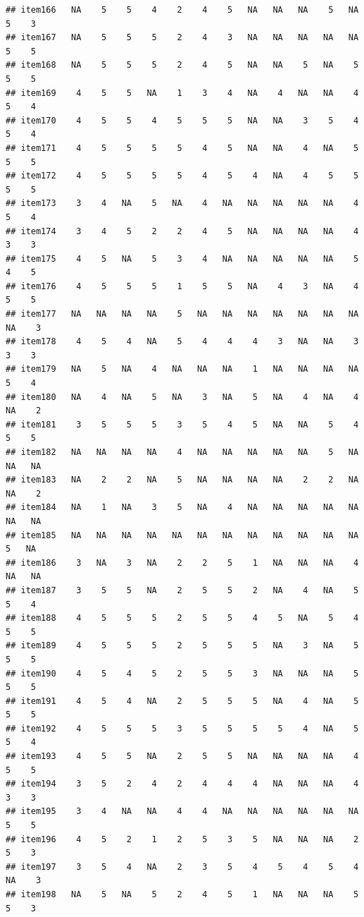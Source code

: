 \documentclass[
  man]{apa6}
\begin{document}
\begin{verbatim}
## item166   NA    5    5    4    2    4    5   NA   NA   NA    5   NA    5    3
## item167   NA    5    5    5    2    4    3   NA   NA   NA   NA   NA    5    5
## item168   NA    5    5    5    2    4    5   NA   NA    5   NA    5    5    5
## item169    4    5    5   NA    1    3    4   NA    4   NA   NA    4    5    4
## item170    4    5    5    4    5    5    5   NA   NA    3    5    4    5    4
## item171    4    5    5    5    5    4    5   NA   NA    4   NA    5    5    5
## item172    4    5    5    5    5    4    5    4   NA    4    5    5    5    5
## item173    3    4   NA    5   NA    4   NA   NA   NA   NA   NA    4    5    4
## item174    3    4    5    2    2    4    5   NA   NA   NA   NA    4    3    3
## item175    4    5   NA    5    3    4   NA   NA   NA   NA   NA    5    4    5
## item176    4    5    5    5    1    5    5   NA    4    3   NA    4    5    5
## item177   NA   NA   NA   NA    5   NA   NA   NA   NA   NA   NA   NA   NA    3
## item178    4    5    4   NA    5    4    4    4    3   NA   NA    3    3    3
## item179   NA    5   NA    4   NA   NA   NA    1   NA   NA   NA   NA    5    4
## item180   NA    4   NA    5   NA    3   NA    5   NA    4   NA    4   NA    2
## item181    3    5    5    5    3    5    4    5   NA   NA    5    4    5    5
## item182   NA   NA   NA   NA    4   NA   NA   NA   NA   NA    5   NA   NA   NA
## item183   NA    2    2   NA    5   NA   NA   NA   NA    2    2   NA   NA    2
## item184   NA    1   NA    3    5   NA    4   NA   NA   NA   NA   NA   NA   NA
## item185   NA   NA   NA   NA   NA   NA   NA   NA   NA   NA   NA   NA    5   NA
## item186    3   NA    3   NA    2    2    5    1   NA   NA   NA    4   NA   NA
## item187    3    5    5   NA    2    5    5    2   NA    4   NA    5    5    4
## item188    4    5    5    5    2    5    5    4    5   NA    5    4    5    5
## item189    4    5    5    5    2    5    5    5   NA    3   NA    5    5    5
## item190    4    5    4    5    2    5    5    3   NA   NA   NA    5    5    5
## item191    4    5    4   NA    2    5    5    5   NA    4   NA    5    5    5
## item192    4    5    5    5    3    5    5    5    5    4   NA    5    5    4
## item193    4    5    5   NA    2    5    5   NA   NA   NA   NA    4    5    5
## item194    3    5    2    4    2    4    4    4   NA   NA   NA    4    3    3
## item195    3    4   NA   NA    4    4   NA   NA   NA   NA   NA   NA    5    5
## item196    4    5    2    1    2    5    3    5   NA   NA   NA    2    5    3
## item197    3    5    4   NA    2    3    5    4    5    4    5    4   NA    3
## item198   NA    5   NA    5    2    4    5    1   NA   NA   NA    5    5    3

\end{verbatim}
\end{document}
